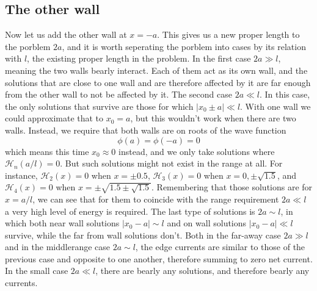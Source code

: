 \documentclass{article}
\begin{document}
\subsection{The other wall}
Now let us add the other wall at $x = -a$. This gives us a new proper length to the porblem $2a$, and it is worth seperating the porblem into cases by its relation with $l$, the existing proper length in the problem.
\newline
In the first case $2a \gg l$, meaning the two walls bearly interact. Each of them act as its own wall, and the solutions that are close to one wall and are therefore affected by it are far enough from the other wall to not be affected by it.
\newline
The second case $2a \ll l$. In this case, the only solutions that survive are those for which $|x_0 \pm a| \ll l$. With one wall we could approximate that to $x_0 = a$, but this wouldn't work when there are two walls. Instead, we require that both walls are on roots of the wave function
\begin{equation}
    \phi(a) = \phi(-a) = 0
\end{equation}
which means this time $x_0 \approx 0$ instead, and we only take solutions where $\mathcal{H}_n(a/l) = 0$. But such solutions might not exist in the range at all. For instance, $\mathcal{H}_2(x) = 0$ when $x = \pm 0.5$, $\mathcal{H}_3(x) = 0$ when $x = 0, \pm \sqrt{1.5}$, and $\mathcal{H}_4(x) = 0$ when $x = \pm \sqrt{1.5 \pm \sqrt{1.5}}$. Remembering that those solutions are for $x = a/l$, we can see that for them to coincide with the range requirement $2a \ll l$ a very high level of energy is required.
\newline
The last type of solutions is $2a \sim l$, in which both near wall solutions $|x_0 - a| \sim l$ and on wall solutions $|x_0 - a| \ll l$ survive, while the far from wall solutions don't. 
\newline
Both in the far-away case $2a \gg l$ and in the middlerange case $2a \sim l$, the edge currents are similar to those of the previous case and opposite to one another, therefore summing to zero net current. In the small case $2a \ll l$, there are bearly any solutions, and therefore bearly any currents.
\end{document}
